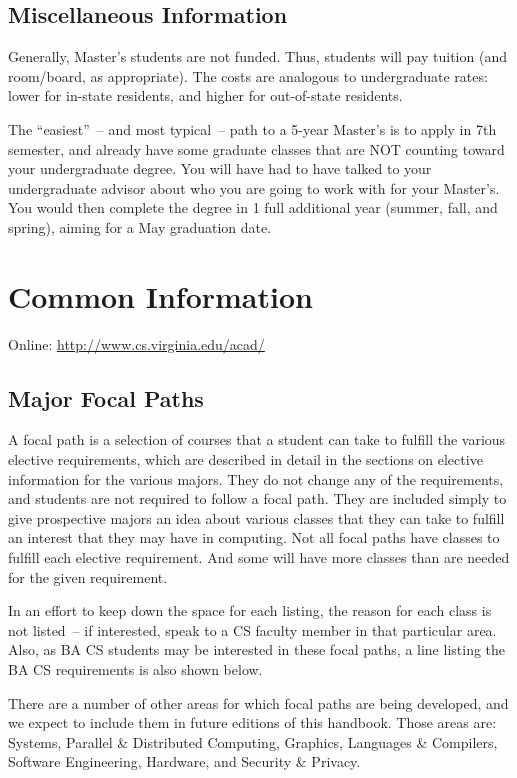\documentclass[10pt,letter,twocolumn]{book}
\newcommand{\mychapter}[2]{\chapter{#1}\renewcommand{\leftmark}{\textsc{#2}}}
\newcommand{\mysection}[1]{\section{#1}\renewcommand{\rightmark}{#1}}
\begin{document}
\mysection{Miscellaneous Information}

Generally, Master's students are not funded.  Thus, students will pay
tuition (and room/board, as appropriate).  The costs are analogous to
undergraduate rates: lower for in-state residents, and higher for
out-of-state residents.

The ``easiest''~-- and most typical~-- path to a 5-year Master's is to
apply in 7th semester, and already have some graduate classes that are
NOT counting toward your undergraduate degree.  You will have had to
have talked to your undergraduate advisor about who you are going to
work with for your Master's.  You would then complete the degree in 1
full additional year (summer, fall, and spring), aiming for a May
graduation date.


\clearpage
\mychapter{Common Information}{Common Information}

\noindent Online: \url{http://www.cs.virginia.edu/acad/}

\mysection{Major Focal Paths}

A focal path is a selection of courses that a student can take to
fulfill the various elective requirements, which are described in
detail in the sections on elective information for the various
majors. They do not change any of the requirements, and students are
not required to follow a focal path. They are included simply to give
prospective majors an idea about various classes that they can take to
fulfill an interest that they may have in computing. Not all focal
paths have classes to fulfill each elective requirement. And some will
have more classes than are needed for the given requirement.

In an effort to keep down the space for each listing, the reason for
each class is not listed~-- if interested, speak to a CS faculty
member in that particular area. Also, as BA CS students may be
interested in these focal paths, a line listing the BA CS requirements
is also shown below.

There are a number of other areas for which focal paths are being
developed, and we expect to include them in future editions of this
handbook. Those areas are: Systems, Parallel \& Distributed Computing,
Graphics, Languages \& Compilers, Software Engineering, Hardware, and
Security \& Privacy.
\end{document}
